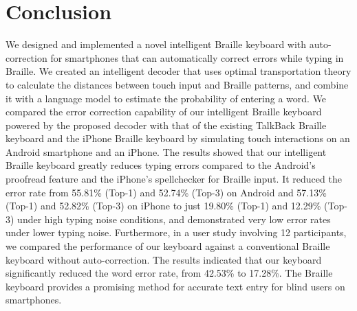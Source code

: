 \documentclass[manuscript,review]{acmart}
\begin{document}
\section{Conclusion}
We designed and implemented a novel intelligent Braille keyboard with auto-correction for smartphones that can automatically correct errors while typing in Braille. We created an intelligent decoder that uses optimal transportation theory to calculate the distances between touch input and Braille patterns, and combine it with a language model to estimate the probability of entering a word. We compared the error correction capability of our intelligent Braille keyboard powered by the proposed decoder with that of the existing TalkBack Braille keyboard and the iPhone Braille keyboard by simulating touch interactions on an Android smartphone and an iPhone. The results showed that our intelligent Braille keyboard greatly reduces typing errors compared to the Android's proofread feature and the iPhone's spellchecker for Braille input. It reduced the error rate from 55.81\% (Top-1) and 52.74\% (Top-3) on Android and 57.13\% (Top-1) and 52.82\% (Top-3) on iPhone to just 19.80\% (Top-1) and 12.29\% (Top-3) under high typing noise conditions, and demonstrated very low error rates under lower typing noise. Furthermore, in a user study involving 12 participants, we compared the performance of our keyboard against a conventional Braille keyboard without auto-correction. The results indicated that our keyboard significantly reduced the word error rate, from 42.53\% to 17.28\%. The Braille keyboard provides a promising method for accurate text entry for blind users on smartphones.



\end{document}
